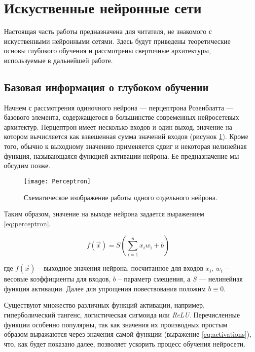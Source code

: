 \section{Искуственные нейронные сети}

\indent
\indent
Настоящая часть работы предназначена для читателя, не знакомого с 
искуственными нейронными сетями. Здесь будут приведены теоретические 
основы глубокого обучения и рассмотрены сверточные архитектуры, 
используемые в дальнейшей работе.

\subsection{Базовая информация о глубоком обучении}

\indent
\indent
Начнем с рассмотрения одиночного нейрона
 --- перцептрона Розенблатта --- базового элемента, содержащегося в большинстве современных нейросетевых архитектур.
Перцептрон имеет несколько входов и один выход, значение на котором
вычисляется как взвешенная сумма значений входов 
(рисунок \ref{tikzpicture: perceptron}).
Кроме того, обычно
к выходному значению применяется сдвиг и некоторая нелинейная функция, 
называющаяся функцией активации нейрона. Ее предназначение мы обсудим позже.

\begin{figure}[h!]
    \begin{center}
   	    \texttt{[image: Perceptron]}
   	\end{center}
   	\caption{Схематическое изображение работы одного отдельного нейрона.}
   	\label{tikzpicture: perceptron}
\end{figure}


\indent
\indent
Таким образом, значение на выходе нейрона задается
 выражением \ref{eq:perceptron}.

\begin{equation}\label{eq:perceptron}
    f(\vec{x}) = S(\sum_{i=1}^n x_i w_i + b)
\end{equation}


где $f(\vec{x})$ -- выходное значения нейрона, посчитанное для входов $x_i$,
$w_i$ -- весовые коэффициенты для входов, $b$ -- параметр смещения, 
а $S$ --- нелинейная функция активации. Далее для упрощения повествования
положим $b \equiv 0$.

\indent
\indent
Существуют множество различных функций активации, например, гиперболический
тангенс, логистическая сигмоида или \textit{ReLU}. Перечисленные
функции особенно популярны, так как значения их производных простым образом 
выражаются через значения самой функции (выражение \ref{eq:activations}), 
что, как будет показано далее, позволяет
ускорить процесс обучения нейросети.


